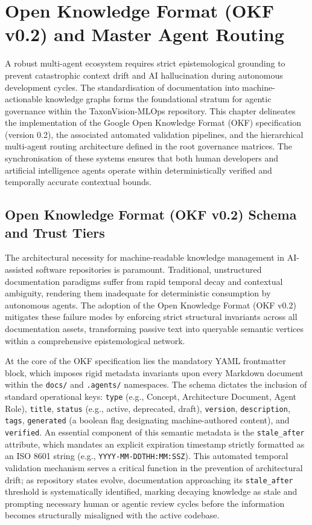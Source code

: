 \chapter{Open Knowledge Format (OKF v0.2) and Master Agent Routing}
\label{ch:agentic_governance_and_okf}

A robust multi-agent ecosystem requires strict epistemological grounding to prevent catastrophic context drift and AI hallucination during autonomous development cycles. The standardisation of documentation into machine-actionable knowledge graphs forms the foundational stratum for agentic governance within the TaxonVision-MLOps repository. This chapter delineates the implementation of the Google Open Knowledge Format (OKF) specification (version 0.2), the associated automated validation pipelines, and the hierarchical multi-agent routing architecture defined in the root governance matrices. The synchronisation of these systems ensures that both human developers and artificial intelligence agents operate within deterministically verified and temporally accurate contextual bounds.

\section{Open Knowledge Format (OKF v0.2) Schema and Trust Tiers}
\label{sec:okf_schema_and_trust_tiers}

The architectural necessity for machine-readable knowledge management in AI-assisted software repositories is paramount. Traditional, unstructured documentation paradigms suffer from rapid temporal decay and contextual ambiguity, rendering them inadequate for deterministic consumption by autonomous agents. The adoption of the Open Knowledge Format (OKF v0.2) mitigates these failure modes by enforcing strict structural invariants across all documentation assets, transforming passive text into queryable semantic vertices within a comprehensive epistemological network.

At the core of the OKF specification lies the mandatory YAML frontmatter block, which imposes rigid metadata invariants upon every Markdown document within the \texttt{docs/} and \texttt{.agents/} namespaces. The schema dictates the inclusion of standard operational keys: \texttt{type} (e.g., Concept, Architecture Document, Agent Role), \texttt{title}, \texttt{status} (e.g., active, deprecated, draft), \texttt{version}, \texttt{description}, \texttt{tags}, \texttt{generated} (a boolean flag designating machine-authored content), and \texttt{verified}. An essential component of this semantic metadata is the \texttt{stale\_after} attribute, which mandates an explicit expiration timestamp strictly formatted as an ISO 8601 string (e.g., \texttt{YYYY-MM-DDTHH:MM:SSZ}). This automated temporal validation mechanism serves a critical function in the prevention of architectural drift; as repository states evolve, documentation approaching its \texttt{stale\_after} threshold is systematically identified, marking decaying knowledge as stale and prompting necessary human or agentic review cycles before the information becomes structurally misaligned with the active codebase.

